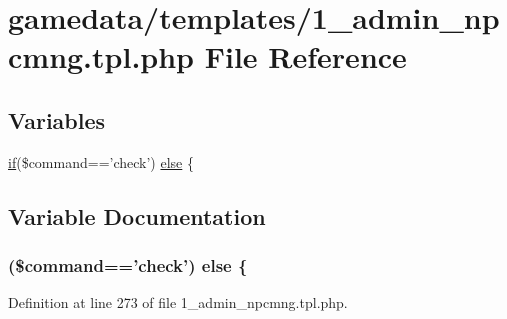 \hypertarget{1__admin__npcmng_8tpl_8php}{\section{gamedata/templates/1\+\_\+admin\+\_\+npcmng.tpl.\+php File Reference}
\label{1__admin__npcmng_8tpl_8php}
}
\subsection*{Variables}
\begin{DoxyCompactItemize}
\item 
\hyperlink{login__old_8php_a4ac1118c2e44c513a674bc1793ba6c90}{if}(\$command=='check') \hyperlink{1__admin__npcmng_8tpl_8php_a7fa2566c59342c05e46c44b306c6a386}{else} \{
\end{DoxyCompactItemize}


\subsection{Variable Documentation}
\hypertarget{1__admin__npcmng_8tpl_8php_a7fa2566c59342c05e46c44b306c6a386}{
\subsubsection[{else}]{ (\$command=='check') else \{}}\label{1__admin__npcmng_8tpl_8php_a7fa2566c59342c05e46c44b306c6a386}


Definition at line 273 of file 1\+\_\+admin\+\_\+npcmng.\+tpl.\+php.

